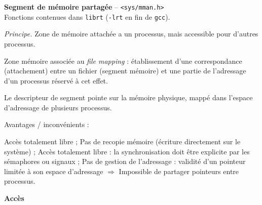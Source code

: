 \documentclass[french]{scrartcl}
\begin{document}
\begin{multicols}{3}
\columnbreak

\vskip 5pt
\textbf{Segment de mémoire partagée} -- \lstinline!<sys/mman.h>!\\
Fonctions contenues dans \lstinline!librt! (\lstinline!-lrt! en fin de \lstinline!gcc!).

\vskip 2pt
\emph{Principe.} Zone de mémoire attachée a un processus, mais accessible pour d'autres processus. 

\vskip 2pt
Zone mémoire associée au \emph{file mapping} : établissement d'une correspondance (attachement) entre un fichier (segment mémoire) et une partie de l'adressage d'un processus réservé à cet effet.

Le descripteur de segment pointe sur la mémoire physique, mappé dans l'espace d'adressage de plusieurs processus.

\vskip 2pt
Avantages / inconvénients :\begin{itemize}
	\Pitem Accès totalement libre ;
	\Pitem Pas de recopie mémoire (écriture directement sur le système) ;
	\Citem Accès totalement libre : la synchronisation doit être explicite par les sémaphores ou signaux ;
	\Citem Pas de gestion de l'adressage : validité d'un pointeur limitée à son espace d'adressage $\Rightarrow$ Impossible de partager pointeurs entre processus.
\end{itemize}

\vskip 5pt
\textbf{Accès}

\vbox{
}

\vbox{
}


\end{multicols}
\end{document}
